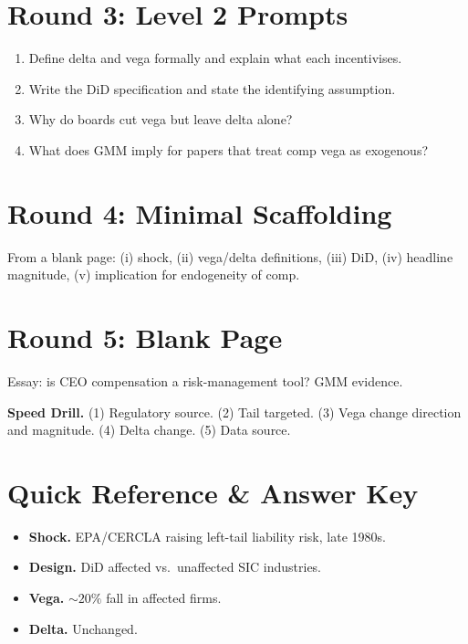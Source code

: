 \documentclass[11pt]{article}
\begin{document}
\section*{Round 3: Level 2 Prompts}
\begin{enumerate}
\item Define delta and vega formally and explain what each incentivises.
\item Write the DiD specification and state the identifying assumption.
\item Why do boards cut vega but leave delta alone?
\item What does GMM imply for papers that treat comp vega as exogenous?
\end{enumerate}

\section*{Round 4: Minimal Scaffolding}
From a blank page: (i) shock, (ii) vega/delta definitions, (iii) DiD, (iv) headline magnitude, (v) implication for endogeneity of comp.

\section*{Round 5: Blank Page}
Essay: is CEO compensation a risk-management tool? GMM evidence.

\vspace{6pt}
\begin{drillbox}
\textbf{Speed Drill.} (1) Regulatory source. (2) Tail targeted. (3) Vega change direction and magnitude. (4) Delta change. (5) Data source.
\end{drillbox}

\section*{Quick Reference \& Answer Key}
\begin{answerbox}
\begin{itemize}
\item \textbf{Shock.} EPA/CERCLA raising left-tail liability risk, late 1980s.
\item \textbf{Design.} DiD affected vs.\ unaffected SIC industries.
\item \textbf{Vega.} $\sim\!20\%$ fall in affected firms.
\item \textbf{Delta.} Unchanged.
\end{itemize}
\end{answerbox}
\end{document}
